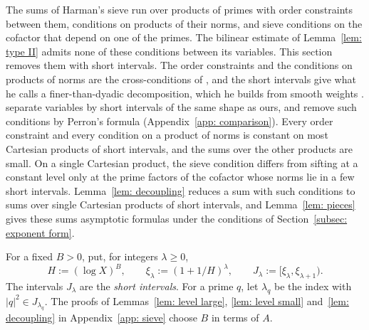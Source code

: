\documentclass{article}
\numberwithin{equation}{section}
\newcommand{\Ge}{\geqslant}
\begin{document}
The sums of Harman's sieve run over products of primes with order constraints between them, conditions on products of their norms, and sieve conditions on the cofactor that depend on one of the primes. The bilinear estimate of Lemma~\ref{lem: type II} admits none of these conditions between its variables. This section removes them with short intervals. The order constraints and the conditions on products of norms are the cross-conditions of \citet[\S7]{merikoski2023polynomials}, and the short intervals give what he calls a finer-than-dyadic decomposition, which he builds from smooth weights \citep[\S3.1]{merikoski2023polynomials}. \citet[\S11.1]{heathbrown2017prime} separate variables by short intervals of the same shape as ours, and \citet[p.~130]{harman2001gaussian} remove such conditions by Perron's formula (Appendix~\ref{app: comparison}). Every order constraint and every condition on a product of norms is constant on most Cartesian products of short intervals, and the sums over the other products are small. On a single Cartesian product, the sieve condition differs from sifting at a constant level only at the prime factors of the cofactor whose norms lie in a few short intervals. Lemma~\ref{lem: decoupling} reduces a sum with such conditions to sums over single Cartesian products of short intervals, and Lemma~\ref{lem: pieces} gives these sums asymptotic formulas under the conditions of Section~\ref{subsec: exponent form}.

For a fixed $B > 0$, put, for integers $\lambda \Ge 0$,
\begin{equation}
\label{eq: short intervals}
H := (\log X)^B, \qquad \xi_\lambda := (1 + 1/H)^{\lambda}, \qquad J_\lambda := [\xi_\lambda, \xi_{\lambda + 1}).
\end{equation}
The intervals $J_\lambda$ are the \emph{short intervals}. For a prime $q$, let $\lambda_q$ be the index with $|q|^2 \in J_{\lambda_q}$. The proofs of Lemmas~\ref{lem: level large}, \ref{lem: level small} and~\ref{lem: decoupling} in Appendix~\ref{app: sieve} choose $B$ in terms of $A$.
\end{document}
